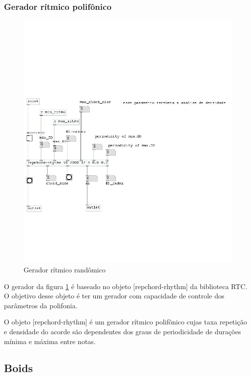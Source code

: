 \documentclass[draft]{ppgmus}
\begin{document}
\subsubsection{Gerador rítmico polifônico}


\begin{figure}
\includegraphics[scale=.6]{gerador-ritmico3}
\caption{Gerador rítmico randômico}
\label{gera-ritmico3}
\end{figure}  

O gerador da figura \ref{gera-ritmico3} é baseado no 
objeto [repchord-rhythm] da biblioteca RTC. O objetivo desse objeto é 
ter um gerador com capacidade de controle dos parâmetros da polifonia.

O objeto [repchord-rhythm] é um gerador rítmico polifônico cujas taxa repetição
e densidade do acorde são dependentes dos graus de periodicidade de durações
mínima e máxima entre notas. 

\subsection{Boids}
\end{document}
